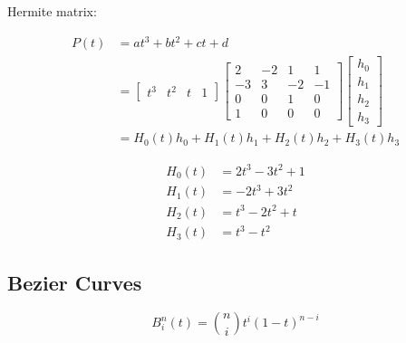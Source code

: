 \documentclass[10pt,landscape]{article}
\begin{document}
\begin{multicols}{3}
Hermite matrix:

\begin{align*}
    P(t) &= at^3 + bt^2 + ct + d \\
    &=  \begin{bmatrix}
            t^3 & t^2 & t & 1
        \end{bmatrix}
        \begin{bmatrix}
            2 & -2 & 1 & 1 \\
            -3 & 3 & -2 & -1 \\
            0 & 0 & 1 & 0 \\
            1 & 0 & 0 & 0
        \end{bmatrix}
        \begin{bmatrix}
            h_0 \\
            h_1 \\
            h_2 \\
            h_3
        \end{bmatrix} \\
    &= H_0(t)h_0 + H_1(t)h_1 + H_2(t)h_2 + H_3(t)h_3
\end{align*}

\begin{align*}
    H_0(t) &= 2t^3 - 3t^2 + 1 \\
    H_1(t) &= -2t^3 + 3t^2 \\
    H_2(t) &= t^3 - 2t^2 + t \\
    H_3(t) &= t^3 - t^2
\end{align*}

\subsection{Bezier Curves}

$$B_i^n(t) = \binom{n}{i} t^i (1-t)^{n-i}$$


\end{multicols}
\end{document}
